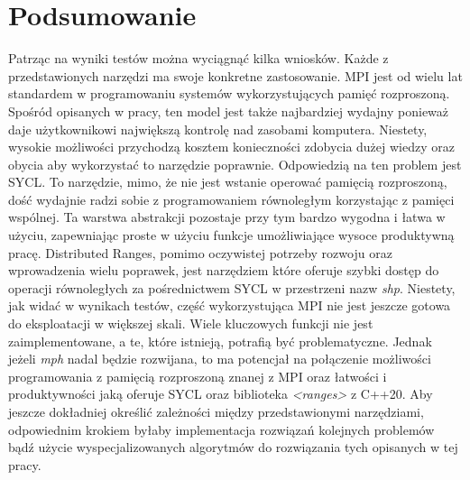 \documentclass[a4paper,12pt]{book} %
\begin{document}
\chapter*{Podsumowanie}
Patrząc na wyniki testów można wyciągnąć kilka wniosków. Każde z przedstawionych narzędzi ma swoje konkretne zastosowanie. MPI jest od wielu lat standardem w programowaniu systemów wykorzystujących pamięć rozproszoną. Spośród opisanych w pracy, ten model jest także najbardziej wydajny ponieważ daje użytkownikowi największą kontrolę nad zasobami komputera. Niestety, wysokie możliwości przychodzą kosztem konieczności zdobycia dużej wiedzy oraz obycia aby wykorzystać to narzędzie poprawnie. Odpowiedzią na ten problem jest SYCL. To narzędzie, mimo, że nie jest wstanie operować pamięcią rozproszoną, dość wydajnie radzi sobie z programowaniem równoległym korzystając z pamięci wspólnej. Ta warstwa abstrakcji pozostaje przy tym bardzo wygodna i łatwa w użyciu, zapewniając proste w użyciu funkcje umożliwiające wysoce produktywną pracę. Distributed Ranges, pomimo oczywistej potrzeby rozwoju oraz wprowadzenia wielu poprawek, jest narzędziem które oferuje szybki dostęp do operacji równoległych za pośrednictwem SYCL w przestrzeni nazw \emph{shp}. Niestety, jak widać w wynikach testów, część wykorzystująca MPI nie jest jeszcze gotowa do eksploatacji w większej skali. Wiele kluczowych funkcji nie jest zaimplementowane, a te, które istnieją, potrafią być problematyczne. Jednak jeżeli \emph{mph} nadal będzie rozwijana, to ma potencjał na połączenie możliwości programowania z pamięcią rozproszoną znanej z MPI oraz łatwości i produktywności jaką oferuje SYCL oraz biblioteka \emph{<ranges>} z C++20. Aby jeszcze dokładniej określić zależności między przedstawionymi narzędziami, odpowiednim krokiem byłaby implementacja rozwiązań kolejnych problemów bądź użycie wyspecjalizowanych algorytmów do rozwiązania tych opisanych w tej pracy.



\listoftables{} %

\listoffigures{} %

\printbibliography
\end{document}
